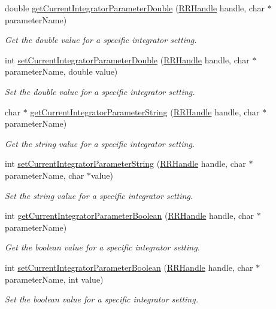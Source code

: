\begin{DoxyCompactItemize}
double \hyperlink{group__simopts_gad859b0cb1724ab3aeee81230c2da272a}{get\+Current\+Integrator\+Parameter\+Double} (\hyperlink{rrc__types_8h_a1d68f0592372208fa5a5f2799ea4b3ae}{R\+R\+Handle} handle, char $\ast$parameter\+Name)
\begin{DoxyCompactList}\small\item\em Get the double value for a specific integrator setting. \end{DoxyCompactList}\item 
int \hyperlink{group__simopts_ga90d69322c437f56d551c14445b57bb5a}{set\+Current\+Integrator\+Parameter\+Double} (\hyperlink{rrc__types_8h_a1d68f0592372208fa5a5f2799ea4b3ae}{R\+R\+Handle} handle, char $\ast$parameter\+Name, double value)
\begin{DoxyCompactList}\small\item\em Set the double value for a specific integrator setting. \end{DoxyCompactList}\item 
char $\ast$ \hyperlink{group__simopts_ga11536f253e0b43f8a282bf3bdfaf1328}{get\+Current\+Integrator\+Parameter\+String} (\hyperlink{rrc__types_8h_a1d68f0592372208fa5a5f2799ea4b3ae}{R\+R\+Handle} handle, char $\ast$parameter\+Name)
\begin{DoxyCompactList}\small\item\em Get the string value for a specific integrator setting. \end{DoxyCompactList}\item 
int \hyperlink{group__simopts_ga7b901ff654788259368fc15c01fe53a6}{set\+Current\+Integrator\+Parameter\+String} (\hyperlink{rrc__types_8h_a1d68f0592372208fa5a5f2799ea4b3ae}{R\+R\+Handle} handle, char $\ast$parameter\+Name, char $\ast$value)
\begin{DoxyCompactList}\small\item\em Set the string value for a specific integrator setting. \end{DoxyCompactList}\item 
int \hyperlink{group__simopts_gab06f6ef3c9c6b57a2806132b1906a52e}{get\+Current\+Integrator\+Parameter\+Boolean} (\hyperlink{rrc__types_8h_a1d68f0592372208fa5a5f2799ea4b3ae}{R\+R\+Handle} handle, char $\ast$parameter\+Name)
\begin{DoxyCompactList}\small\item\em Get the boolean value for a specific integrator setting. \end{DoxyCompactList}\item 
int \hyperlink{group__simopts_gab89192771385f30f5223756c46bda227}{set\+Current\+Integrator\+Parameter\+Boolean} (\hyperlink{rrc__types_8h_a1d68f0592372208fa5a5f2799ea4b3ae}{R\+R\+Handle} handle, char $\ast$parameter\+Name, int value)
\begin{DoxyCompactList}\small\item\em Set the boolean value for a specific integrator setting. \end{DoxyCompactList}\end{DoxyCompactItemize}


